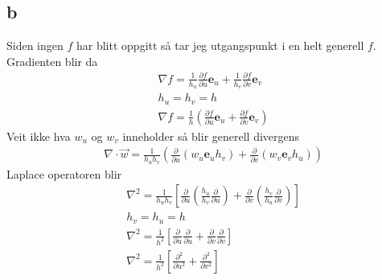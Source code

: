\documentclass[a4paper,10pt,norsk]{article}
\begin{document}
	\subsection*{b}
		Siden ingen $f$ har blitt oppgitt så tar jeg utgangspunkt i en helt generell $f$. Gradienten blir da
		\begin{align*}
			&\nabla f = \frac{1}{h_u} \frac{\partial f}{\partial u} \mathbf{e}_u + \frac{1}{h_v} \frac{\partial f}{\partial v} \mathbf{e}_v\\
			&\boxed{h_u=h_v=h}\\
			&\nabla f = \frac{1}{h} \left( \frac{\partial f}{\partial u} \mathbf{e}_u + \frac{\partial f}{\partial v} \mathbf{e}_v \right) 
		\end{align*}
		Veit ikke hva $w_u$ og $w_v$ inneholder så blir generell divergens
		\begin{align*}
			&\nabla \cdot \vec{w} = \frac{1}{h_u h_v} \left( \frac{\partial }{\partial u} \left( w_u \mathbf{e}_u h_v \right) + \frac{\partial }{\partial v} \left( w_v \mathbf{e}_v h_u \right)  \right) 
		\end{align*}
		Laplace operatoren blir
		\begin{align*}
			&\nabla^2 = \frac{1}{h_u h_v} \left[\frac{\partial }{\partial u} \left( \frac{h_u}{h_v} \frac{\partial }{\partial u}  \right) 
			+ \frac{\partial }{\partial v} \left( \frac{h_v}{h_u} \frac{\partial }{\partial v}  \right) \right]\\
			&\boxed{h_v=h_u=h}\\
			&\nabla^2 = \frac{1}{h^2} \left[\frac{\partial }{\partial u} \frac{\partial }{\partial u}  + \frac{\partial }{\partial v} \frac{\partial }{\partial v} \right]\\
			&\nabla^2 = \frac{1}{h^2} \left[\frac{\partial ^2}{\partial u^2} + \frac{\partial ^2}{\partial v^2} \right]
		\end{align*}
\end{document}
